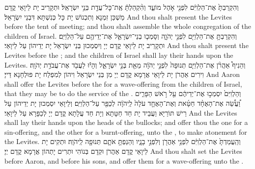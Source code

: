 {וְהִקְרַבְתָּ֙ אֶת־הַלְוִיִּ֔ם לִפְנֵ֖י אֹ֣הֶל מוֹעֵ֑ד וְהִ֨קְהַלְתָּ֔ אֶֽת־כׇּל־עֲדַ֖ת בְּנֵ֥י יִשְׂרָאֵֽל׃
}
{וּתְקָרֵיב יָת לֵיוָאֵי קֳדָם מַשְׁכַּן זִמְנָא וְתִכְנוֹשׁ יָת כָּל כְּנִשְׁתָּא דִּבְנֵי יִשְׂרָאֵל׃}
{And thou shalt present the Levites before the tent of meeting; and thou shalt assemble the whole congregation of the children of Israel.}{}
{וְהִקְרַבְתָּ֥ אֶת־הַלְוִיִּ֖ם לִפְנֵ֣י יְהֹוָ֑ה וְסָמְכ֧וּ בְנֵי־יִשְׂרָאֵ֛ל אֶת־יְדֵיהֶ֖ם עַל־הַלְוִיִּֽם׃}
{וּתְקָרֵיב יָת לֵיוָאֵי קֳדָם יְיָ וְיִסְמְכוּן בְּנֵי יִשְׂרָאֵל יָת יְדֵיהוֹן עַל לֵיוָאֵי׃}
{And thou shalt present the Levites before the \lord; and the children of Israel shall lay their hands upon the Levites.}{}
{וְהֵנִיף֩ אַהֲרֹ֨ן אֶת־הַלְוִיִּ֤ם תְּנוּפָה֙ לִפְנֵ֣י יְהֹוָ֔ה מֵאֵ֖ת בְּנֵ֣י יִשְׂרָאֵ֑ל וְהָי֕וּ לַעֲבֹ֖ד אֶת־עֲבֹדַ֥ת יְהֹוָֽה׃
}
{וִירִים אַהֲרֹן יָת לֵיוָאֵי אֲרָמָא קֳדָם יְיָ מִן בְּנֵי יִשְׂרָאֵל וִיהוֹן לְמִפְלַח יָת פּוּלְחָנָא דַּייָ׃}
{And Aaron shall offer the Levites before the \lord\space for a wave-offering from the children of Israel, that they may be to do the service of the \lord.}{}
{וְהַלְוִיִּם֙ יִסְמְכ֣וּ אֶת־יְדֵיהֶ֔ם עַ֖ל רֹ֣אשׁ הַפָּרִ֑ים וַ֠עֲשֵׂ֠ה אֶת־הָאֶחָ֨ד חַטָּ֜את וְאֶת־הָאֶחָ֤ד עֹלָה֙ לַֽיהֹוָ֔ה לְכַפֵּ֖ר עַל־הַלְוִיִּֽם׃}
{וְלֵיוָאֵי יִסְמְכוּן יָת יְדֵיהוֹן עַל רֵישׁ תּוֹרַיָּא וַעֲבֵיד יָת חַד חַטָּתָא וְיָת חַד עֲלָתָא קֳדָם יְיָ לְכַפָּרָא עַל לֵיוָאֵי׃}
{And the Levites shall lay their hands upon the heads of the bullocks; and offer thou the one for a sin-offering, and the other for a burnt-offering, unto the \lord, to make atonement for the Levites.}{}
{וְהַֽעֲמַדְתָּ֙ אֶת־הַלְוִיִּ֔ם לִפְנֵ֥י אַהֲרֹ֖ן וְלִפְנֵ֣י בָנָ֑יו וְהֵנַפְתָּ֥ אֹתָ֛ם תְּנוּפָ֖ה לַֽיהֹוָֽה׃}
{וּתְקִים יָת לֵיוָאֵי קֳדָם אַהֲרֹן וּקְדָם בְּנוֹהִי וּתְרִים יָתְהוֹן אֲרָמָא קֳדָם יְיָ׃}
{And thou shalt set the Levites before Aaron, and before his sons, and offer them for a wave-offering unto the \lord.}{}
